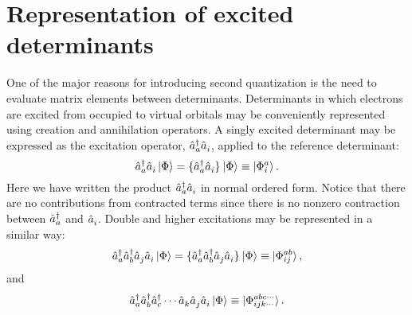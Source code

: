 \documentclass[../Main/chem532-notes.tex]{subfiles}
\begin{document}
\section{Representation of excited determinants}

One of the major reasons for introducing second quantization is the need to evaluate matrix elements between determinants.
Determinants in which electrons are excited from occupied to virtual orbitals may be conveniently represented using creation and annihilation operators.
A singly excited determinant may be expressed as the excitation operator, $\hat{a}_{a}^{\dagger} \hat{a}_{i}^{\,}$, applied to the reference determinant:
\begin{equation}
\hat{a}_{a}^{\dagger} \hat{a}_{i}^{\,} \ket{\Phi} = \{{\hat{a}_{a}^{\dagger} \hat{a}_{i}^{\,}}\}_{} \ket{\Phi} \equiv \ket{\Phi_{i}^{a}}.
\end{equation}
Here we have written the product $\hat{a}_{a}^{\dagger} \hat{a}_{i}^{\,}$ in normal ordered form.
Notice that there are no contributions from contracted terms since there is no nonzero contraction between $\hat{a}_{a}^{\dagger}$ and $\hat{a}_{i}^{\,}$.
Double and higher excitations may be represented in a similar way:
\begin{equation}
\hat{a}_{a}^{\dagger}\hat{a}_{b}^{\dagger} \hat{a}_{j}^{\,} \hat{a}_{i}^{\,} \ket{\Phi} = \{{\hat{a}_{a}^{\dagger}\hat{a}_{b}^{\dagger} \hat{a}_{j}^{\,} \hat{a}_{i}^{\,}}\}_{} \ket{\Phi}
\equiv \ket{\Phi_{ij}^{ab}},
\end{equation}
and
\begin{equation}
\hat{a}_{a}^{\dagger}\hat{a}_{b}^{\dagger}\hat{a}_{c}^{\dagger} \cdots \hat{a}_{k}^{\,} \hat{a}_{j}^{\,} \hat{a}_{i}^{\,} \ket{\Phi} \equiv \ket{\Phi_{ijk\cdots}^{abc\cdots}}.
\end{equation}
\end{document}
